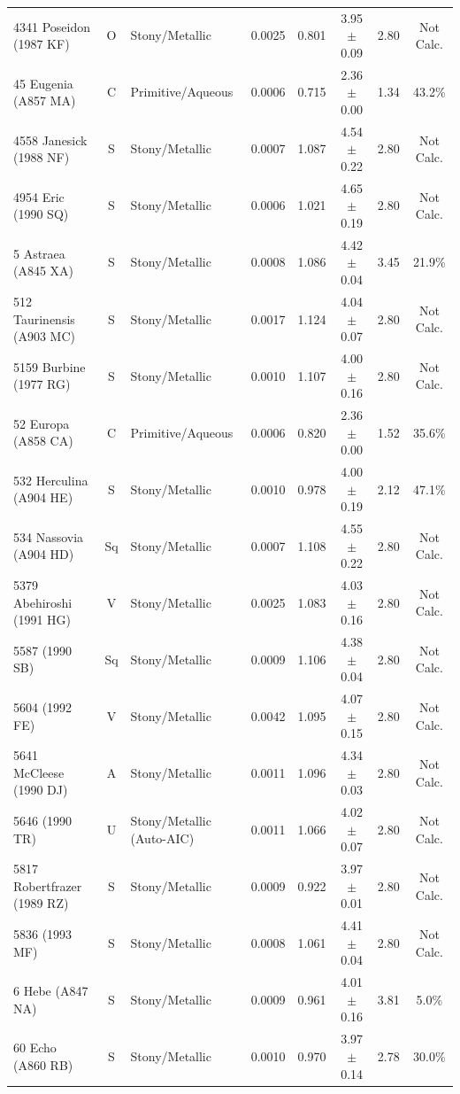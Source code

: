 {\begin{longtable}{p{2.6cm} c p{2.2cm} c c c c c}
4341 Poseidon (1987 KF) & O & Stony/Metallic & 0.0025 & 0.801 & 3.95 $\pm$ 0.09 & 2.80 & Not Calc. \\
45 Eugenia (A857 MA) & C & Primitive/Aqueous & 0.0006 & 0.715 & 2.36 $\pm$ 0.00 & 1.34 & 43.2\% \\
4558 Janesick (1988 NF) & S & Stony/Metallic & 0.0007 & 1.087 & 4.54 $\pm$ 0.22 & 2.80 & Not Calc. \\
4954 Eric (1990 SQ) & S & Stony/Metallic & 0.0006 & 1.021 & 4.65 $\pm$ 0.19 & 2.80 & Not Calc. \\
5 Astraea (A845 XA) & S & Stony/Metallic & 0.0008 & 1.086 & 4.42 $\pm$ 0.04 & 3.45 & 21.9\% \\
512 Taurinensis (A903 MC) & S & Stony/Metallic & 0.0017 & 1.124 & 4.04 $\pm$ 0.07 & 2.80 & Not Calc. \\
5159 Burbine (1977 RG) & S & Stony/Metallic & 0.0010 & 1.107 & 4.00 $\pm$ 0.16 & 2.80 & Not Calc. \\
52 Europa (A858 CA) & C & Primitive/Aqueous & 0.0006 & 0.820 & 2.36 $\pm$ 0.00 & 1.52 & 35.6\% \\
532 Herculina (A904 HE) & S & Stony/Metallic & 0.0010 & 0.978 & 4.00 $\pm$ 0.19 & 2.12 & 47.1\% \\
534 Nassovia (A904 HD) & Sq & Stony/Metallic & 0.0007 & 1.108 & 4.55 $\pm$ 0.22 & 2.80 & Not Calc. \\
5379 Abehiroshi (1991 HG) & V & Stony/Metallic & 0.0025 & 1.083 & 4.03 $\pm$ 0.16 & 2.80 & Not Calc. \\
5587 (1990 SB) & Sq & Stony/Metallic & 0.0009 & 1.106 & 4.38 $\pm$ 0.04 & 2.80 & Not Calc. \\
5604 (1992 FE) & V & Stony/Metallic & 0.0042 & 1.095 & 4.07 $\pm$ 0.15 & 2.80 & Not Calc. \\
5641 McCleese (1990 DJ) & A & Stony/Metallic & 0.0011 & 1.096 & 4.34 $\pm$ 0.03 & 2.80 & Not Calc. \\
5646 (1990 TR) & U & Stony/Metallic (Auto-AIC) & 0.0011 & 1.066 & 4.02 $\pm$ 0.07 & 2.80 & Not Calc. \\
5817 Robertfrazer (1989 RZ) & S & Stony/Metallic & 0.0009 & 0.922 & 3.97 $\pm$ 0.01 & 2.80 & Not Calc. \\
5836 (1993 MF) & S & Stony/Metallic & 0.0008 & 1.061 & 4.41 $\pm$ 0.04 & 2.80 & Not Calc. \\
6 Hebe (A847 NA) & S & Stony/Metallic & 0.0009 & 0.961 & 4.01 $\pm$ 0.16 & 3.81 & 5.0\% \\
60 Echo (A860 RB) & S & Stony/Metallic & 0.0010 & 0.970 & 3.97 $\pm$ 0.14 & 2.78 & 30.0\% \\

\end{longtable}}
